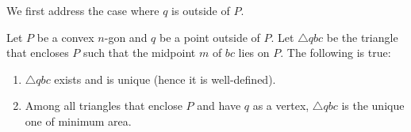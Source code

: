 \documentclass[11pt, oneside]{article}
\begin{document}
We first address the case where $q$ is outside of $P$.
\begin{proposition}
\label{proposition n-gon wedge minimal triangle}
Let $P$ be a convex $n$-gon
and $q$ be a point outside of $P$.
Let $\triangle qbc$ be the triangle that encloses $P$ 
such that the midpoint $m$ of $bc$ lies on $P$.
The following is true:
\begin{enumerate}
\item\label{proposition n-gon wedge minimal triangle item exists unique}
$\triangle qbc$ exists and is unique
(hence it is well-defined).

\item\label{proposition n-gon wedge minimal triangle item minimality}
Among all triangles that enclose $P$
and have $q$ as a vertex,
$\triangle qbc$ is the unique one of minimum area.
\end{enumerate}
\end{proposition}
\end{document}
